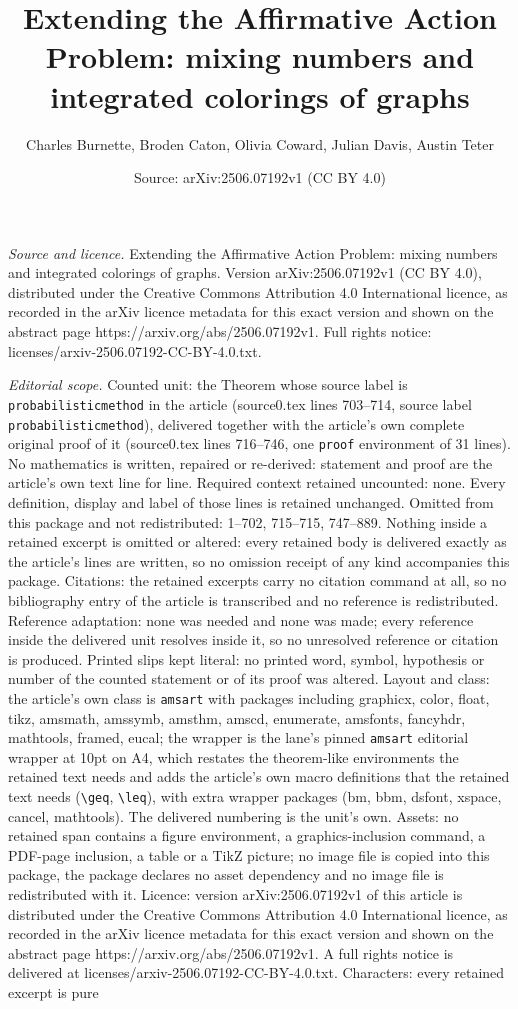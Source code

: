 \documentclass[10pt,a4paper]{amsart}
\title[Extending the Affirmative Action Problem: mixing numbers and]{Extending the Affirmative Action Problem: mixing numbers and integrated colorings of graphs}
\author{Charles Burnette, Broden Caton, Olivia Coward, Julian Davis, Austin Teter}
\date{Source: arXiv:2506.07192v1 (CC BY 4.0)}
\begin{document}
\maketitle

\noindent\emph{Source and licence.} Extending the Affirmative Action Problem: mixing numbers and integrated colorings of graphs. Version arXiv:2506.07192v1 (CC BY 4.0), distributed under the Creative Commons Attribution 4.0 International licence, as recorded in the arXiv licence metadata for this exact version and shown on the abstract page https://arxiv.org/abs/2506.07192v1. Full rights notice: licenses/arxiv-2506.07192-CC-BY-4.0.txt.\par\smallskip

\noindent\textit{Editorial scope.} Counted unit: the Theorem whose source label is \texttt{probabilisticmethod} in the article (source0.tex lines 703--714, source label \texttt{probabilisticmethod}), delivered together with the article's own complete original proof of it (source0.tex lines 716--746, one \texttt{proof} environment of 31 lines). No mathematics is written, repaired or re-derived: statement and proof are the article's own text line for line. Required context retained uncounted: none. Every definition, display and label of those lines is retained unchanged. Omitted from this package and not redistributed: 1--702, 715--715, 747--889. Nothing inside a retained excerpt is omitted or altered: every retained body is delivered exactly as the article's lines are written, so no omission receipt of any kind accompanies this package. Citations: the retained excerpts carry no citation command at all, so no bibliography entry of the article is transcribed and no reference is redistributed. Reference adaptation: none was needed and none was made; every reference inside the delivered unit resolves inside it, so no unresolved reference or citation is produced. Printed slips kept literal: no printed word, symbol, hypothesis or number of the counted statement or of its proof was altered. Layout and class: the article's own class is \texttt{amsart} with packages including graphicx, color, float, tikz, amsmath, amssymb, amsthm, amscd, enumerate, amsfonts, fancyhdr, mathtools, framed, eucal; the wrapper is the lane's pinned \texttt{amsart} editorial wrapper at 10pt on A4, which restates the theorem-like environments the retained text needs and adds the article's own macro definitions that the retained text needs (\texttt{\textbackslash geq}, \texttt{\textbackslash leq}), with extra wrapper packages (bm, bbm, dsfont, xspace, cancel, mathtools). The delivered numbering is the unit's own. Assets: no retained span contains a figure environment, a graphics-inclusion command, a PDF-page inclusion, a table or a TikZ picture; no image file is copied into this package, the package declares no asset dependency and no image file is redistributed with it. Licence: version arXiv:2506.07192v1 of this article is distributed under the Creative Commons Attribution 4.0 International licence, as recorded in the arXiv licence metadata for this exact version and shown on the abstract page https://arxiv.org/abs/2506.07192v1. A full rights notice is delivered at licenses/arxiv-2506.07192-CC-BY-4.0.txt. Characters: every retained excerpt is pure 
\end{document}
